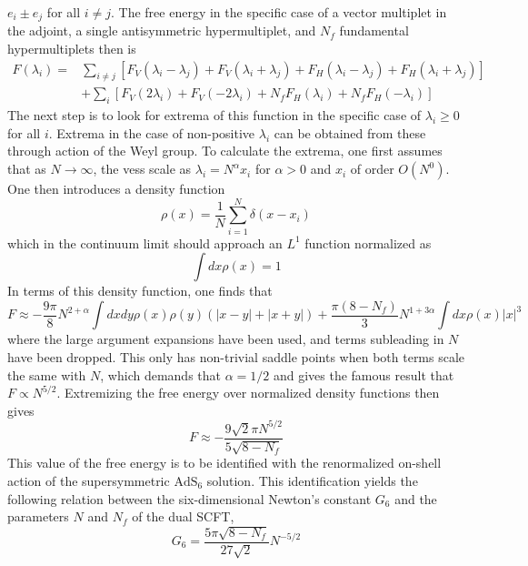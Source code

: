 \documentclass{article}
\begin{document}
\(e_{i} \pm e_{j}\) for all \(i \neq j\). The free energy in the specific case of a vector multiplet in the adjoint, a single antisymmetric hypermultiplet, and \(N_{f}\) fundamental hypermultiplets then is
\[
\begin{aligned}
F\left(\lambda_{i}\right)= & \sum_{i \neq j}\left[F_{V}\left(\lambda_{i}-\lambda_{j}\right)+F_{V}\left(\lambda_{i}+\lambda_{j}\right)+F_{H}\left(\lambda_{i}-\lambda_{j}\right)+F_{H}\left(\lambda_{i}+\lambda_{j}\right)\right] \\
& +\sum_{i}\left[F_{V}\left(2 \lambda_{i}\right)+F_{V}\left(-2 \lambda_{i}\right)+N_{f} F_{H}\left(\lambda_{i}\right)+N_{f} F_{H}\left(-\lambda_{i}\right)\right]
\end{aligned}
\]
The next step is to look for extrema of this function in the specific case of \(\lambda_{i} \geq 0\) for all \(i\). Extrema in the case of non-positive \(\lambda_{i}\) can be obtained from these through action of the Weyl group. To calculate the extrema, one first assumes that as \(N \rightarrow \infty\), the vess scale as \(\lambda_{i}=N^{\alpha} x_{i}\) for \(\alpha>0\) and \(x_{i}\) of order \(O\left(N^{0}\right)\). One then introduces a density function
\[
\rho(x)=\frac{1}{N} \sum_{i=1}^{N} \delta\left(x-x_{i}\right)
\]
which in the continuum limit should approach an \(L^{1}\) function normalized as
\[
\int d x \rho(x)=1
\]
In terms of this density function, one finds that
\[
F \approx-\frac{9 \pi}{8} N^{2+\alpha} \int d x d y \rho(x) \rho(y)(|x-y|+|x+y|)+\frac{\pi(8-N_{f})}{3} N^{1+3 \alpha} \int d x \rho(x) |x|^{3}
\]
where the large argument expansions have been used, and terms subleading in \(N\) have been dropped. This only has non-trivial saddle points when both terms scale the same with \(N\), which demands that \(\alpha=1 / 2\) and gives the famous result that \(F \propto N^{5 / 2}\). Extremizing the free energy over normalized density functions then gives
\[
F \approx-\frac{9 \sqrt{2} \pi N^{5 / 2}}{5 \sqrt{8-N_{f}}}
\]
This value of the free energy is to be identified with the renormalized on-shell action of the supersymmetric \(\mathrm{AdS}_{6}\) solution. This identification yields the following relation between the six-dimensional Newton's constant \(G_{6}\) and the parameters \(N\) and \(N_{f}\) of the dual SCFT,
\[
G_{6}=\frac{5 \pi \sqrt{8-N_{f}}}{27 \sqrt{2}} N^{-5 / 2}
\]
\end{document}
